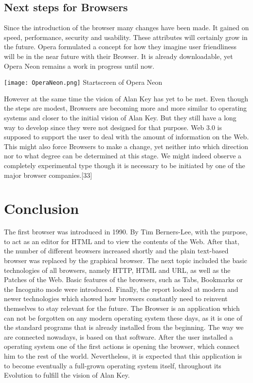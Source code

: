 \documentclass[runningheads]{llncs}
\begin{document}
		\subsection{Next steps for Browsers}
			Since the introduction of the browser many changes have been made. It gained on speed, performance, security and usability. These attributes will certainly grow in the future.
			Opera formulated a concept for how they imagine user friendliness will be in the near future with their Browser. It is already downloadable, yet Opera Neon remains a work in progress until now.
		 	\begin{center}
		 		\texttt{[image: OperaNeon.png]}
		 		Startscreen of Opera Neon
		 	\end{center}

		 	However at the same time the vision of Alan Key has yet to be met.
			Even though the steps are modest, Browsers are becoming more and more similar to operating systems and closer to the initial vision of Alan Key. But they still have a long way to develop since they were not designed for that purpose.
			\newline
			Web 3.0 is supposed to support the user to deal with the amount of information on the Web. This might also force Browsers to make a change, yet neither into which direction nor to what degree can be determined at this stage. We might indeed observe a completely experimental type though it is necessary to be initiated by one of the major browser companies.[33]
	\section{Conclusion}
	The first browser was introduced in 1990. By Tim Berners-Lee, with the purpose, to act as an editor for HTML and to view the contents of the Web. After that, the number of different browsers increased shortly and the plain text-based browser was replaced by the graphical browser. The next topic included the basic technologies of all browsers, namely HTTP, HTML and URL, as well as the Patches of the Web. Basic features of the browsers, such as Tabs, Bookmarks or the Incognito mode were introduced. Finally, the report looked at modern and newer technologies which showed how browsers constantly need to reinvent themselves to stay relevant for the future.
	The Browser is an application which can not be forgotten on any modern operating system these days, as it is one of the standard programs that is already installed from the beginning. The way we are connected nowadays, is based on that software. After the user installed a operating system one of the first actions is opening the browser, which connect him to the rest of the world.
	\newline
	Nevertheless, it is expected that this application is to become eventually a full-grown operating system itself, throughout its Evolution to fulfill the vision of Alan Key.
\end{document}
